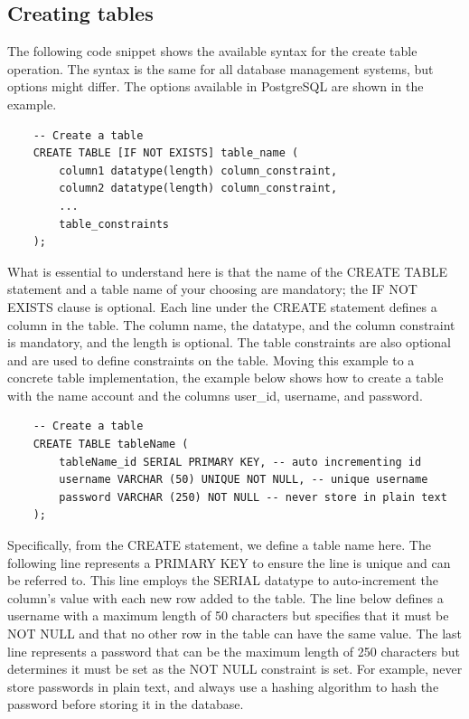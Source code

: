 \subsection{Creating tables}
The following code snippet shows the available syntax for the create table operation. The syntax is the same for all database management systems, but options might differ. The options available in PostgreSQL are shown in the example.

\begin{verbatim}
    -- Create a table
    CREATE TABLE [IF NOT EXISTS] table_name (
        column1 datatype(length) column_constraint,
        column2 datatype(length) column_constraint,
        ...
        table_constraints
    );
\end{verbatim}

What is essential to understand here is that the name of the CREATE TABLE statement and a table name of your choosing are mandatory; the IF NOT EXISTS clause is optional. Each line under the CREATE statement defines a column in the table. The column name, the datatype, and the column constraint is mandatory, and the length is optional. The table constraints are also optional and are used to define constraints on the table. Moving this example to a concrete table implementation, the example below shows how to create a table with the name account and the columns user\_id, username, and password.

\begin{verbatim}
    -- Create a table
    CREATE TABLE tableName (
        tableName_id SERIAL PRIMARY KEY, -- auto incrementing id
        username VARCHAR (50) UNIQUE NOT NULL, -- unique username
        password VARCHAR (250) NOT NULL -- never store in plain text
    );
\end{verbatim}

Specifically, from the CREATE statement, we define a table name here. The following line represents a PRIMARY KEY to ensure the line is unique and can be referred to. This line employs the SERIAL datatype to auto-increment the column's value with each new row added to the table. The line below defines a username with a maximum length of 50 characters but specifies that it must be NOT NULL and that no other row in the table can have the same value. The last line represents a password that can be the maximum length of 250 characters but determines it must be set as the NOT NULL constraint is set. For example, never store passwords in plain text, and always use a hashing algorithm to hash the password before storing it in the database.

